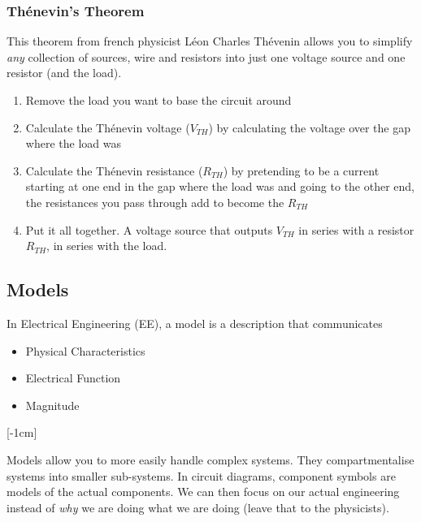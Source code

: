 \documentclass[12pt]{article}
\begin{document}
\subsubsection{Th\'enevin's Theorem}
This theorem from french physicist Léon Charles Thévenin allows you to simplify \textit{any} collection of sources, wire and resistors into just one voltage source and one resistor (and the load).
\begin{enumerate}
  \item Remove the load you want to base the circuit around
  \item Calculate the Th\'enevin voltage ($V_{TH}$) by calculating the voltage over the gap where the load was
  \item Calculate the Th\'enevin resistance ($R_{TH}$) by pretending to be a current starting at one end in the gap where the load was and going to the other end, the resistances you pass through add to become the $R_{TH}$
  \item Put it all together. A voltage source that outputs $V_{TH}$ in series with a resistor $R_{TH}$, in series with the load.
\end{enumerate}

\subsection{Models}
In Electrical Engineering (EE), a model is a description that communicates

\begin{itemize}
  \item Physical Characteristics 
  \item Electrical Function
  \item Magnitude
\end{itemize}

[-1cm]

\vspace{3pt}
Models allow you to more easily handle complex systems.
They compartmentalise systems into smaller sub-systems.
In circuit diagrams, component symbols are models of the actual components.
We can then focus on our actual engineering instead of {\it why} we are doing what we are doing (leave that to the physicists).
\end{document}
